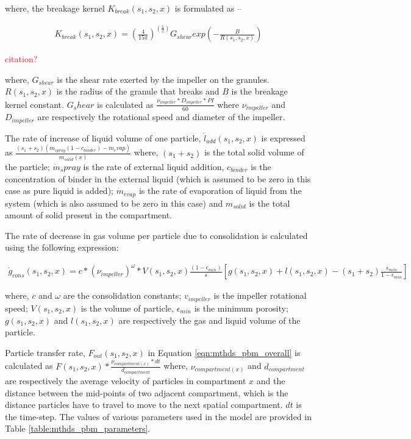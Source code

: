 \documentclass[preprint,11pt,authoryear]{elsarticle}
\begin{document}
	    \par where, the breakage kernel $K_{break}(s_1,s_2,x)$ is formulated as – 
	    
	    \begin{align}
	    K_{break}(s_1,s_2,x)=\left(\frac{4}{15\pi}\right)^{(\frac{1}{2})}G_{shear}exp\left(-\frac{B}{R(s_1,s_2,x)}\right)
	    \end{align}
	    \par \textcolor{red}{citation?}
	
	      \par where, $G_{shear}$ is the shear rate exerted by the impeller on the granules. $R(s_1,s_2,x)$ is the radius of the granule that breaks and $B$ is the breakage kernel constant. $G_shear$ is calculated as $\frac{\nu_{impeller}*D_{impeller}*PI}{60}$ where $\nu_{impeller}$ and $D_{impeller}$ are respectively the rotational speed and diameter of the impeller.
	      \par The rate of increase of liquid volume of one particle, $\dot{l}_{add}(s_1,s_2,x)$ is expressed as $\frac{(s_1+s_2)(\dot{m}_{spray}(1-c_{binder})-\dot{m}_evap)}{m_{solid}(x)}$ where, $(s_1+s_2)$  is the total solid volume of the particle; $\dot{m}_spray$ is the rate of external liquid addition, $c_{binder}$ is the concentration of binder in the external liquid (which is assumed to be zero in this case as pure liquid is added); $\dot{m}_{evap}$ is the rate of evaporation of liquid from the system (which is also assumed to be zero in this case) and $m_{solid}$ is the total amount of solid present in the compartment.
	      \par The rate of decrease in gas volume per particle due to consolidation is calculated using the following expression: 
	      
	      \begin{align}
	      \dot{g}_{cons}(s_1,s_2,x)=c*(\nu_{impeller})^{\omega}*V(s_1,s_2,x)\frac{(1-\epsilon_{min})}{s} [g(s_1,s_2,x)+l(s_1,s_2,x) -(s_1+s_2)\frac{\epsilon_{min}}{1-\epsilon_{min}}]
	      \end{align}          
	    
	    \par where, $c$ and $\omega$ are the consolidation constants; $v_{impeller}$ is the impeller rotational speed; $V(s_1,s_2,x)$ is the volume of particle, $\epsilon_{min}$ is the minimum porosity; $g(s_1,s_2,x)$ and $l(s_1,s_2,x)$ are respectively the gas and liquid volume of the particle.
	  
	    \par Particle transfer rate, $F_{out}(s_1,s_2,x)$ in Equation \ref{eqn:mthds_pbm_overall} is calculated as $F(s_1,s_2,x)*\frac{\nu_{compartment(x)}*dt}{d_{compartment}}$ where, $\nu_{compartment(x)}$ and $d_{compartment}$ are respectively the average velocity of particles in compartment $x$ and the distance between the mid-points of two adjacent compartment, which is the distance particles have to travel to move to the next spatial compartment. $dt$ is the time-step.
	The values of various parameters used in the model are provided in Table \ref{table:mthds_pbm_parameters}.
	
\end{document}
